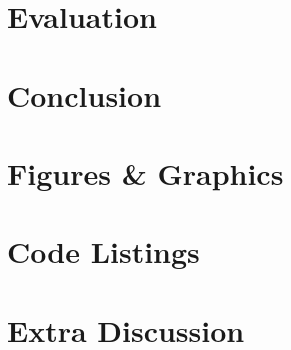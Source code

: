 \documentclass{l4proj}
\begin{document}
\chapter{Evaluation}


\chapter{Conclusion}


%
%








\begin{appendices}

\chapter[Figures]{Figures \& Graphics}


\chapter{Code Listings}


\chapter{Extra Discussion}


\end{appendices}
\end{document}
